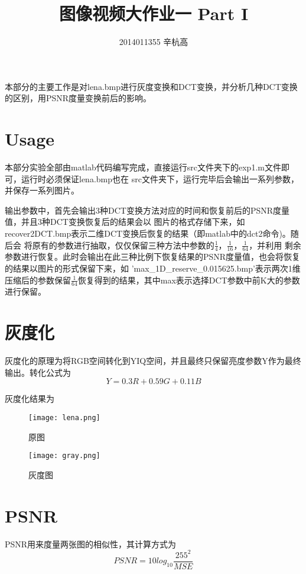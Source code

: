 \documentclass{ctexart}
\author{2014011355 辛杭高}
\title{图像视频大作业一 Part I}
\begin{document}
\maketitle
本部分的主要工作是对lena.bmp进行灰度变换和DCT变换，并分析几种DCT变换的区别，用PSNR度量变换前后的影响。


\section{Usage}
本部分实验全部由matlab代码编写完成，直接运行src文件夹下的exp1.m文件即可，运行时必须保证lena.bmp也在
src文件夹下，运行完毕后会输出一系列参数，并保存一系列图片。

输出参数中，首先会输出3种DCT变换方法对应的时间和恢复前后的PSNR度量值，并且3种DCT变换恢复后的结果会以
图片的格式存储下来，如recover2DCT.bmp表示二维DCT变换后恢复的结果（即matlab中的dct2命令)。随后会
将原有的参数进行抽取，仅仅保留三种方法中参数的$\frac{1}{4}$，$\frac{1}{16}$，$\frac{1}{64}$，并利用
剩余参数进行恢复。此时会输出在此三种比例下恢复结果的PSNR度量值，也会将恢复的结果以图片的形式保留下来，如
'max\_1D\_reserve\_0.015625.bmp'表示两次1维压缩后的参数保留$\frac{1}{64}$恢复得到的结果，其中max表示选择DCT参数中前K大的参数进行保留。

\section{灰度化}
灰度化的原理为将RGB空间转化到YIQ空间，并且最终只保留亮度参数Y作为最终输出。转化公式为
\begin{equation}
  Y = 0.3R + 0.59G + 0.11B
\end{equation}

灰度化结果为

\begin{figure}  
\begin{minipage}[t]{0.5\linewidth}  
\centering  
\texttt{[image: lena.png]}  
\caption{原图}  
\label{fig:side:a}  
\end{minipage}%
\begin{minipage}[t]{0.5\linewidth}  
\centering  
\texttt{[image: gray.png]}  
\caption{灰度图}  
\label{fig:side:b}  
\end{minipage}  
\end{figure} 

\section{PSNR}
PSNR用来度量两张图的相似性，其计算方式为
\begin{equation}
PSNR = 10log_{10} \frac {{255} ^ 2}  {MSE} 
\end{equation}
\end{document}
